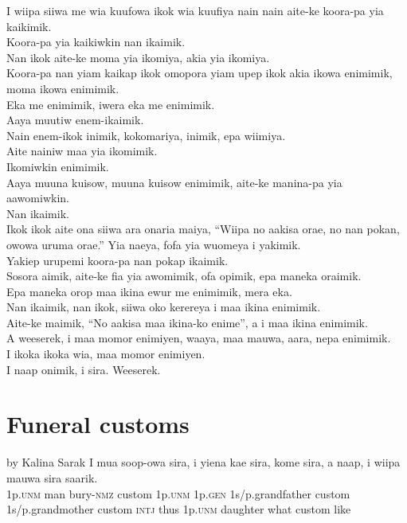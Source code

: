 I wiipa siiwa me wia kuufowa ikok wia kuufiya nain nain aite-ke koora-pa yia kaikimik. \\
Koora-pa yia kaikiwkin  nan ikaimik. \\
Nan ikok aite-ke moma yia ikomiya, akia yia ikomiya. \\
Koora-pa nan yiam kaikap ikok omopora yiam upep ikok  akia ikowa enimimik,  moma ikowa enimimik. \\
Eka me enimimik, iwera eka me enimimik. \\
Aaya muutiw enem-ikaimik. \\
Nain enem-ikok inimik, kokomariya, inimik, epa wiimiya. \\
Aite nainiw maa yia ikomimik. \\
Ikomiwkin enimimik. \\
Aaya muuna kuisow, muuna kuisow enimimik, aite-ke manina-pa yia aawomiwkin. \\
Nan ikaimik. \\
\textrm{Ikok ikok aite ona siiwa ara onaria maiya, “Wiipa no aakisa orae, no nan pokan, owowa uruma orae.”}
Yia naeya, fofa yia wuomeya i yakimik. \\
Yakiep urupemi koora-pa nan pokap ikaimik. \\
Sosora aimik, aite-ke fia yia awomimik, ofa opimik, epa maneka oraimik. \\
Epa maneka orop maa ikina ewur me enimimik, mera eka. \\
Nan ikaimik, nan ikok, siiwa oko kerereya i maa ikina enimimik. \\
Aite-ke maimik, “No aakisa maa ikina-ko enime”, a i maa ikina enimimik. \\
A weeserek, i maa momor enimiyen, waaya, maa mauwa, aara, nepa enimimik. \\
I ikoka ikoka wia, maa momor enimiyen. \\
I naap onimik, i sira. Weeserek. \\
\setcounter{equation}{0}
\section{ Funeral customs}

 by Kalina Sarak
\ea
\gll  I  mua  soop-owa  sira,  i  yiena  kae  sira,                    kome  sira,  a  naap,  i  wiipa  mauwa  sira  saarik. \\
1p.\textsc{unm}  man  bury-\textsc{nmz}  custom  1p.\textsc{unm}  1p.\textsc{gen}  1s/p.grandfather  custom 1s/p.grandmother  custom  \textsc{intj}  thus  1p.\textsc{unm}  daughter  what  custom  like \\



